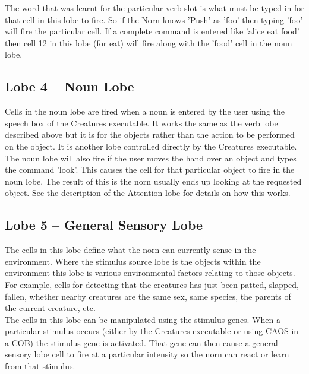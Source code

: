 \documentclass[11pt,twoside,a4paper]{article}
\begin{document}
The word that was learnt for the particular verb slot is what must be typed in for that cell in this lobe to fire. So if the Norn knows 'Push' as 'foo' then typing 'foo' will fire the particular cell. If a complete command is entered like 'alice eat food' then cell 12 in this lobe (for eat) will fire along with the 'food' cell in the noun lobe.

\subsection{Lobe 4 -- Noun Lobe}

Cells in the noun lobe are fired when a noun is entered by the user using the speech box of the Creatures executable. It works the same as the verb lobe described above but it is for the objects rather than the action to be performed on the object. It is another lobe controlled directly by the Creatures executable.~\\

The noun lobe will also fire if the user moves the hand over an object and types the command 'look'. This causes the cell for that particular object to fire in the noun lobe. The result of this is the norn usually ends up looking at the requested object. See the description of the Attention lobe for details on how this works.

\subsection{Lobe 5 -- General Sensory Lobe}

The cells in this lobe define what the norn can currently sense in the environment. Where the stimulus source lobe is the objects within the environment this lobe is various environmental factors relating to those objects. For example, cells for detecting that the creatures has just been patted, slapped, fallen, whether nearby creatures are the same sex, same species, the parents of the current creature, etc.~\\

The cells in this lobe can be manipulated using the stimulus genes. When a particular stimulus occurs (either by the Creatures executable or using CAOS in a COB) the stimulus gene is activated. That gene can then cause a general sensory lobe cell to fire at a particular intensity so the norn can react or learn from that stimulus.~\\

\end{document}
